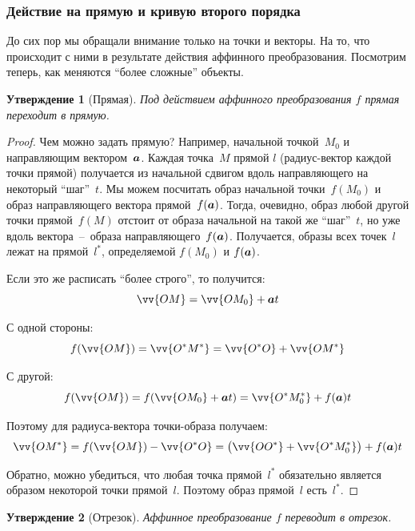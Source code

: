 \documentclass[a4paper,12pt]{article}
\newtheorem{proposition}{Утверждение}[section]
\begin{document}
  
  \subsubsection{Действие на прямую и кривую второго порядка}
  
  До сих пор мы обращали внимание только на точки и векторы.
  На то, что происходит с ними в результате действия аффинного преобразования.
  Посмотрим теперь, как меняются ``более сложные'' объекты.
  
  \begin{proposition}[Прямая]
    Под действием аффинного преобразования $f$ прямая переходит в прямую.
  \end{proposition}
  
  \begin{proof}
    Чем можно задать прямую?
    Например, начальной точкой~$M_0$ и направляющим вектором~$\boldsymbol a$.
    Каждая точка~$M$ прямой $l$ (радиус-вектор каждой точки прямой) получается из начальной сдвигом вдоль направляющего на некоторый ``шаг''~$t$.
    Мы можем посчитать образ начальной точки~$f(M_0)$ и образ направляющего вектора прямой~$f(\boldsymbol a)$.
    Тогда, очевидно, образ любой другой точки прямой~$f(M)$ отстоит от образа начальной на такой же ``шаг''~$t$, но уже вдоль вектора~--~образа направляющего~$f(\boldsymbol a)$.
    Получается, образы всех точек~$l$ лежат на прямой~$l^*$, определяемой $f(M_0)$ и $f(\boldsymbol a)$.
    
    Если это же расписать ``более строго'', то получится:
    \[
      \vv{OM} = \vv{OM_0} + \bds a t
    \]
    
    С одной стороны:
    \[
      f(\vv{OM}) = \vv{O^*M^*} = \vv{O^*O} + \vv{OM^*}
    \]
    
    С другой:
    \[
      f(\vv{OM}) = f(\vv{OM_0} + \bds a t) = \vv{O^*M_0^*} + f(\bds a) t
    \]
    
    Поэтому для радиуса-вектора точки-образа получаем:
    \[
      \vv{OM^*} = f(\vv{OM}) - \vv{O^*O} = \bigl(\vv{OO^*} + \vv{O^*M_0^*}\bigr) + f(\bds a) t
    \]
    
    Обратно, можно убедиться, что любая точка прямой~$l^*$ обязательно является образом некоторой точки прямой~$l$.
    Поэтому образ прямой~$l$ есть~$l^*$.
  \end{proof}
  
  
  \begin{proposition}[Отрезок]
    Аффинное преобразование $f$ переводит в отрезок.
  \end{proposition}
  
\end{document}
